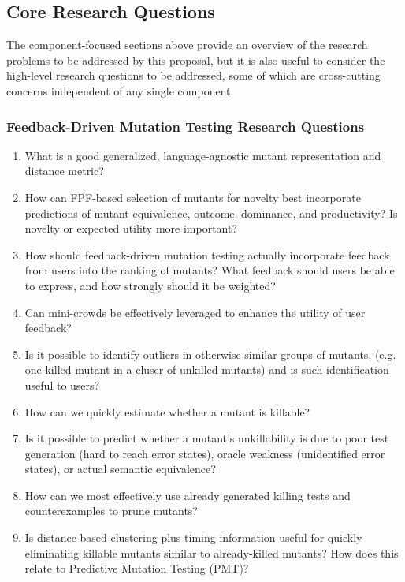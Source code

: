 \subsection{Core Research Questions}

The component-focused sections above provide an overview of the
research problems to be addressed by this proposal, but it is also
useful to consider the high-level research questions to be addressed,
some of which are cross-cutting concerns independent of any single
component.

\subsubsection{Feedback-Driven Mutation Testing
Research Questions}

\begin{enumerate}
\item What is a good generalized, language-agnostic mutant representation
  and distance metric?
\item How can FPF-based selection of mutants for novelty best incorporate
  predictions of mutant equivalence, outcome, dominance, and
  productivity?  Is novelty or expected utility more important?
\item How should feedback-driven mutation testing actually incorporate feedback from users into the
  ranking of mutants?   What feedback should users be able to express,
  and how strongly should it be weighted?
\item Can mini-crowds be effectively leveraged to enhance the utility of user feedback?
\item Is it possible to identify outliers in otherwise similar groups of
  mutants, (e.g. one killed mutant in a cluser of unkilled mutants) and is such identification useful to users?
\item How can we quickly estimate whether a
  mutant is killable?
\item Is it possible to predict whether a mutant's unkillability is due to poor test
  generation (hard to reach error states), oracle weakness
  (unidentified error states), or actual semantic equivalence?
\item How can  we most effectively use already generated killing tests
  and counterexamples to prune mutants?
\item Is distance-based clustering plus timing information useful for quickly
  eliminating killable mutants similar to already-killed mutants?  How
  does this relate to Predictive Mutation Testing (PMT)?

\end{enumerate}

